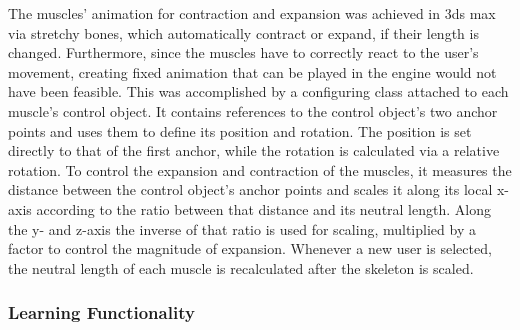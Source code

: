 The muscles' animation for contraction and expansion was achieved in 3ds max via stretchy bones, which automatically contract or expand, if their length is changed. Furthermore, since the muscles have to correctly react to the user's movement, creating fixed animation that can be played in the engine would not have been feasible. This was accomplished by a configuring class attached to each muscle's control object. It contains references to the control object's two anchor points and uses them to define its position and rotation. The position is set directly to that of the first anchor, while the rotation is calculated via a relative rotation. To control the expansion and contraction of the muscles, it measures the distance between the control object's anchor points and scales it along its local x-axis according to the ratio between that distance and its neutral length. Along the y- and z-axis the inverse of that ratio is used for scaling, multiplied by a factor to control the magnitude of expansion. Whenever a new user is selected, the neutral length of each muscle is recalculated after the skeleton is scaled.

\subsubsection{Learning Functionality}
